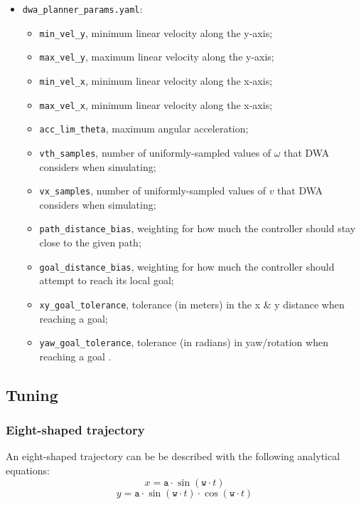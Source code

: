 \documentclass[11pt,a4paper]{article}
\begin{document}
\begin{itemize}
    \item \texttt{dwa\_planner\_params.yaml}:
        \begin{itemize}
            \item \texttt{min\_vel\_y}, minimum linear velocity along the y-axis;
            \item \texttt{max\_vel\_y}, maximum linear velocity along the y-axis;
            \item \texttt{min\_vel\_x}, minimum linear velocity along the x-axis;
            \item \texttt{max\_vel\_x}, minimum linear velocity along the x-axis;
            \item \texttt{acc\_lim\_theta}, maximum angular acceleration;
            \item \texttt{vth\_samples}, number of uniformly-sampled values of $\omega$ that DWA considers when simulating;
            \item \texttt{vx\_samples}, number of uniformly-sampled values of $v$ that DWA considers when simulating;
            \item \texttt{path\_distance\_bias}, weighting for how much the controller should stay close to the given path;
            \item \texttt{goal\_distance\_bias}, weighting for how much the controller should attempt to reach its local goal;
            \item \texttt{xy\_goal\_tolerance}, tolerance (in meters) in the x \& y distance when reaching a goal;
            \item \texttt{yaw\_goal\_tolerance}, tolerance (in radians) in yaw/rotation when reaching a goal .\\
        \end{itemize}

\end{itemize}


\subsection{Tuning}

\subsubsection{Eight-shaped trajectory}

An eight-shaped trajectory can be be described with the following analytical equations:
$$x = \texttt{a} \cdot \sin (\texttt{w} \cdot t)$$
$$y = \texttt{a} \cdot \sin (\texttt{w} \cdot t)\cdot \cos (\texttt{w} \cdot t)$$\\
\end{document}
